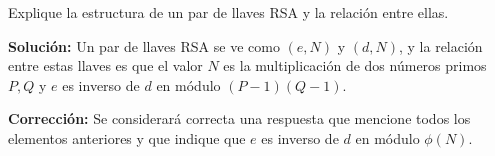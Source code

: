 
Explique la estructura de un par de llaves RSA y la relación entre ellas.

\textbf{Solución:} Un par de llaves RSA se ve como $(e, N)$ y $(d, N)$, y la relación entre estas llaves es que el valor $N$ es la multiplicación de dos números primos $P,Q$ y $e$ es inverso de $d$ en módulo $(P-1)(Q-1)$.

\textbf{Corrección:} Se considerará correcta una respuesta que mencione todos los elementos anteriores y que indique que $e$ es inverso de $d$ en módulo $\phi(N)$.
